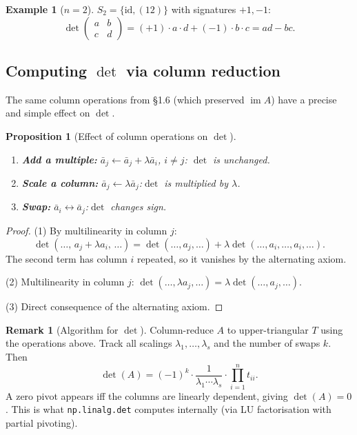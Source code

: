 \documentclass[11pt]{article}
\theoremstyle{definition}
\newtheorem{example}{Example}[section]
\newtheorem{remark}{Remark}[section]
\theoremstyle{plain}
\newtheorem{proposition}{Proposition}[section]
\begin{document}
\begin{example}[$n=2$]
  $S_2 = \{\mathrm{id}, (12)\}$ with signatures $+1,-1$:
  \[
    \det\begin{pmatrix}a&b\\c&d\end{pmatrix}
    = (+1)\cdot a\cdot d + (-1)\cdot b\cdot c = ad-bc.
  \]
\end{example}

\subsection{Computing $\det$ via column reduction}

The same column operations from \S1.6 (which preserved $\operatorname{im}A$)
have a precise and simple effect on $\det$.

\begin{proposition}[Effect of column operations on $\det$]
  \leavevmode
  \begin{enumerate}
    \item \textbf{Add a multiple:}
          $\bar a_j \leftarrow \bar a_j + \lambda\bar a_i$, $i\ne j$:
          \quad $\det$ is \emph{unchanged}.
    \item \textbf{Scale a column:}
          $\bar a_j \leftarrow \lambda\bar a_j$:\quad $\det$ is
          \emph{multiplied by $\lambda$}.
    \item \textbf{Swap:}
          $\bar a_i \leftrightarrow \bar a_j$:\quad $\det$
          \emph{changes sign}.
  \end{enumerate}
\end{proposition}
\begin{proof}
  (1) By multilinearity in column $j$:
  \[
    \det(\ldots,\,a_j+\lambda a_i,\,\ldots)
    = \det(\ldots,a_j,\ldots)
    + \lambda\det(\ldots,a_i,\ldots,a_i,\ldots).
  \]
  The second term has column $i$ repeated, so it vanishes by the
  alternating axiom.

  (2) Multilinearity in column $j$:
  $\det(\ldots,\lambda a_j,\ldots)=\lambda\det(\ldots,a_j,\ldots)$.

  (3) Direct consequence of the alternating axiom.
\end{proof}

\begin{remark}[Algorithm for $\det$]
  Column-reduce $A$ to upper-triangular $T$ using the operations above.
  Track all scalings $\lambda_1,\ldots,\lambda_s$ and the number of
  swaps $k$.  Then
  \[
    \det(A)
    = (-1)^k \cdot
      \frac{1}{\lambda_1\cdots\lambda_s}
      \cdot \prod_{i=1}^n t_{ii}.
  \]
  A zero pivot appears iff the columns are linearly dependent, giving
  $\det(A)=0$.  This is what \texttt{np.linalg.det} computes internally
  (via LU factorisation with partial pivoting).
\end{remark}
\end{document}
